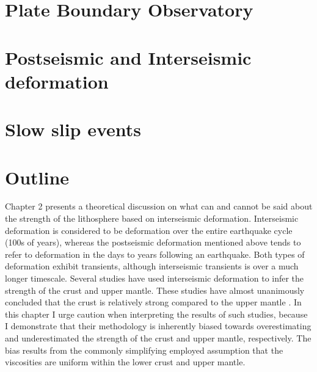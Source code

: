 \section{Plate Boundary Observatory}

\section{Postseismic and Interseismic deformation}

\section{Slow slip events}

\section{Outline}
Chapter 2 presents a theoretical discussion on what can and cannot be
said about the strength of the lithosphere based on interseismic
deformation. Interseismic deformation is considered to be deformation
over the entire earthquake cycle (100s of years), whereas the
postseismic deformation mentioned above tends to refer to deformation
in the days to years following an earthquake. Both types of
deformation exhibit transients, although interseismic transients is
over a much longer timescale. Several studies have used interseismic
deformation to infer the strength of the crust and upper mantle. These
studies have almost unanimously concluded that the crust is relatively
strong compared to the upper mantle \citep{Thatcher2008}. In this
chapter I urge caution when interpreting the results of such studies,
because I demonstrate that their methodology is inherently biased
towards overestimating and underestimated the strength of the crust
and upper mantle, respectively. The bias results from the commonly
simplifying employed assumption that the viscosities are uniform
within the lower crust and upper mantle.

